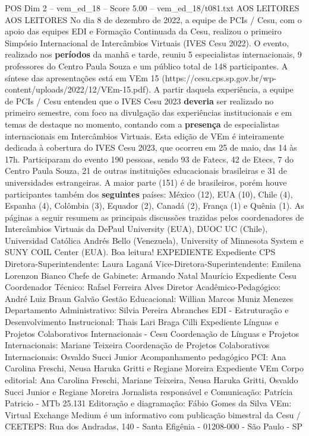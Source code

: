 \begin{textsample}{POS Dim 2 – vem\_ed\_18 – Score 5.00 – vem\_ed\_18/t081.txt}  \label{ex:f2_pos_083}
AOS LEITORES AOS LEITORES No dia 8 de dezembro de 2022, a equipe de PCIs / Cesu, com o apoio das equipes EDI e Formação Continuada da Cesu, realizou o primeiro Simpósio Internacional de Intercâmbios Virtuais (IVES Cesu 2022).
O evento, realizado nos \textbf{períodos} da manhã e tarde, reuniu 5 especialistas internacionais, 9 professores do Centro Paula Souza e um público total de 148 participantes.
A síntese das apresentações está em VEm 15 (https://cesu.cps.sp.gov.br/wp-content/uploads/2022/12/VEm-15.pdf).
A partir daquela experiência, a equipe de PCIs / Cesu entendeu que o IVES Cesu 2023 \textbf{deveria} ser realizado no primeiro semestre, com foco na divulgação das experiências institucionais e em temas de destaque no momento, contando com a \textbf{presença} de especialistas internacionais em Intercâmbios Virtuais.
Esta edição de VEm é inteiramente dedicada à cobertura do IVES Cesu 2023, que ocorreu em 25 de maio, das 14 às 17h.
Participaram do evento 190 pessoas, sendo 93 de Fatecs, 42 de Etecs, 7 do Centro Paula Souza, 21 de outras instituições educacionais brasileiras e 31 de universidades estrangeiras.
A maior parte (151) é de brasileiros, porém houve participantes também dos \textbf{seguintes} países: México (12), EUA (10), Chile (4), Espanha (4), Colômbia (3), Equador (2), Canadá (2), França (1) e Quênia (1).
As páginas a seguir resumem as principais discussões trazidas pelos coordenadores de Intercâmbios Virtuais da DePaul University (EUA), DUOC UC (Chile), Universidad Católica Andrés Bello (Venezuela), University of Minnesota System e SUNY COIL Center (EUA).
Boa leitura!
EXPEDIENTE Expediente CPS Diretora-Superintendente: Laura Laganá Vice-Diretora-Superintendente: Emilena Lorenzon Bianco Chefe de Gabinete: Armando Natal Maurício Expediente Cesu Coordenador Técnico: Rafael Ferreira Alves Diretor Acadêmico-Pedagógico: André Luiz Braun Galvão Gestão Educacional: Willian Marcos Muniz Menezes Departamento Administrativo: Silvia Pereira Abranches EDI - Estruturação e Desenvolvimento Instrucional: Thais Lari Braga Cilli Expediente Línguas e Projetos Colaborativos Internacionais - Cesu Coordenação de Línguas e Projetos Internacionais: Mariane Teixeira Coordenação de Projetos Colaborativos Internacionais: Osvaldo Succi Junior Acompanhamento pedagógico PCI: Ana Carolina Freschi, Neusa Haruka Gritti e Regiane Moreira Expediente VEm Corpo editorial: Ana Carolina Freschi, Mariane Teixeira, Neusa Haruka Gritti, Osvaldo Succi Junior e Regiane Moreira Jornalista responsável e Comunicação: Patrícia Patricio - MTb 25.131 Editoração e diagramação: Fábio Gomes da Silva VEm: Virtual Exchange Medium é um informativo com publicação bimestral da Cesu / CEETEPS: Rua dos Andradas, 140 - Santa Efigênia - 01208-000 - São Paulo - SP

\end{textsample}
